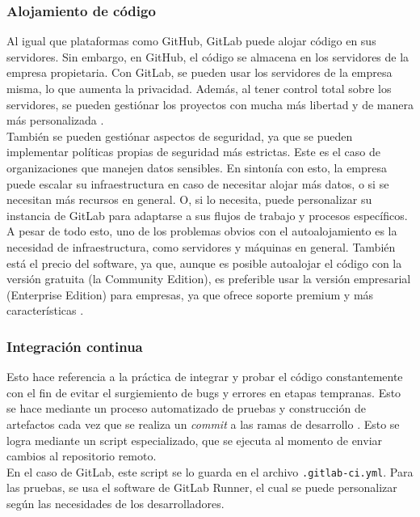 \documentclass[runningheads]{llncs}
\begin{document}
\subsubsection{Alojamiento de código}
Al igual que plataformas como GitHub, GitLab puede alojar código en sus servidores. Sin embargo, en GitHub, el código se almacena
en los servidores de la empresa propietaria. Con GitLab, se pueden usar los servidores de la empresa misma, lo que aumenta la
privacidad. Además, al tener control total sobre los servidores, se pueden gestiónar los proyectos con mucha más libertad y de manera
más personalizada \cite{safari2020structural}.\\
También se pueden gestiónar aspectos de seguridad, ya que se pueden implementar políticas propias de seguridad más estrictas. Este es
el caso de organizaciones que manejen datos sensibles. En sintonía con esto, la empresa puede escalar su infraestructura en caso de
necesitar alojar más datos, o si se necesitan más recursos en general. O, si lo necesita, puede personalizar su instancia de GitLab para
adaptarse a sus flujos de trabajo y procesos específicos.\\
A pesar de todo esto, uno de los problemas obvios con el autoalojamiento es la necesidad de infraestructura, como servidores y máquinas
en general. También está el precio del software, ya que, aunque es posible autoalojar el código con la versión gratuita (la Community Edition),
es preferible usar la versión empresarial (Enterprise Edition) para empresas, ya que ofrece soporte premium y más características \cite{safari2020structural}.
\subsubsection{Integración continua}
Esto hace referencia a la práctica de integrar y probar el código constantemente con el fin de evitar el surgiemiento
de bugs y errores en etapas tempranas. Esto se hace mediante un proceso automatizado de pruebas y construcción de artefactos
cada vez que se realiza un \textit{commit} a las ramas de desarrollo \cite{alvin2023devops,uddin2023comparative}. Esto se logra
mediante un script especializado, que se ejecuta al momento de enviar cambios al repositorio remoto.\\
En el caso de GitLab, este script se lo guarda en el archivo \texttt{.gitlab-ci.yml}. Para las pruebas, se usa el software
de GitLab Runner, el cual se puede personalizar según las necesidades de los desarrolladores.
\end{document}
